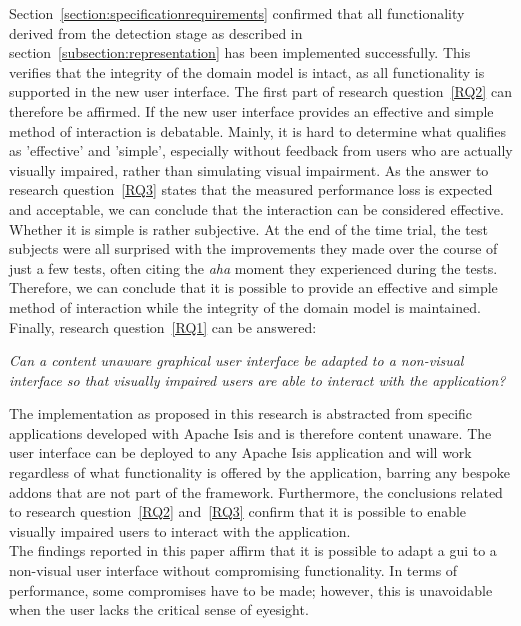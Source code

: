 Section~\ref{section:specificationrequirements} confirmed that all functionality derived from the detection stage as described in section~\ref{subsection:representation} has been implemented successfully. This verifies that the integrity of the domain model is intact, as all functionality is supported in the new user interface. The first part of research question~\ref{RQ2} can therefore be affirmed. If the new user interface provides an effective and simple method of interaction is debatable. Mainly, it is hard to determine what qualifies as 'effective' and 'simple', especially without feedback from users who are actually visually impaired, rather than simulating visual impairment. As the answer to research question~\ref{RQ3} states that the measured performance loss is expected and acceptable, we can conclude that the interaction can be considered effective. Whether it is simple is rather subjective. At the end of the time trial, the test subjects were all surprised with the improvements they made over the course of just a few tests, often citing the \textit{aha} moment they experienced during the tests. Therefore, we can conclude that it is possible to provide an effective and simple method of interaction while the integrity of the domain model is maintained.\\
\newline
\noindent 
Finally, research question~\ref{RQ1} can be answered:

\begin{displayquote}
	\textit{Can a content unaware graphical user interface be adapted to a non-visual interface so that visually impaired users are able to interact with the application?}
\end{displayquote}

The implementation as proposed in this research is abstracted from specific applications developed with Apache Isis and is therefore content unaware. The user interface can be deployed to any Apache Isis application and will work regardless of what functionality is offered by the application, barring any bespoke addons that are not part of the framework. Furthermore, the conclusions related to research question~\ref{RQ2} and~\ref{RQ3} confirm that it is possible to enable visually impaired users to interact with the application.\\
\newline
The findings reported in this paper affirm that it is possible to adapt a \acrshort{gui} to a non-visual user interface without compromising functionality. In terms of performance, some compromises have to be made; however, this is unavoidable when the user lacks the critical sense of eyesight.

